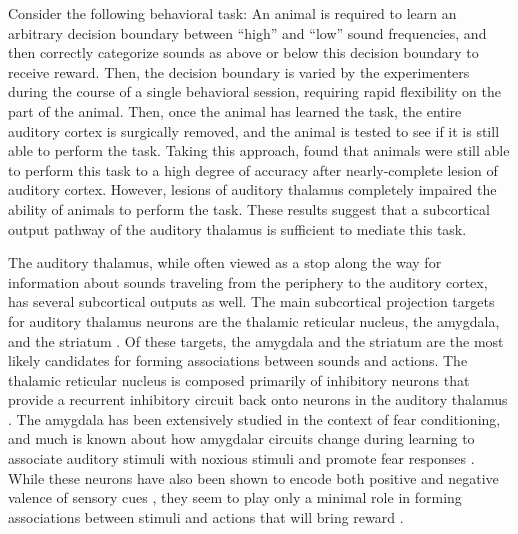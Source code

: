Consider the following behavioral task: An animal is required to learn an arbitrary decision boundary between ``high'' and ``low'' sound frequencies, and then correctly categorize sounds as above or below this decision boundary to receive reward.
Then, the decision boundary is varied by the experimenters during the course of a single behavioral session, requiring rapid flexibility on the part of the animal.
Then, once the animal has learned the task, the entire auditory cortex is surgically removed, and the animal is tested to see if it is still able to perform the task.
Taking this approach, \citet{Gimenez2015} found that animals were still able to perform this task to a high degree of accuracy after nearly-complete lesion of auditory cortex.
However, lesions of auditory thalamus completely impaired the ability of animals to perform the task. 
These results suggest that a subcortical output pathway of the auditory thalamus is sufficient to mediate this task.

The auditory thalamus, while often viewed as a stop along the way for information about sounds traveling from the periphery to the auditory cortex, has several subcortical outputs as well.
The main subcortical projection targets for auditory thalamus neurons are the thalamic reticular nucleus, the amygdala, and the striatum \citep{Pinault2004, Bartlett2013}.
Of these targets, the amygdala and the striatum are the most likely candidates for forming associations between sounds and actions.
The thalamic reticular nucleus is composed primarily of inhibitory neurons that provide a recurrent inhibitory circuit back onto neurons in the auditory thalamus \citep{Pinault2004}. 
The amygdala has been extensively studied in the context of fear conditioning, and much is known about how amygdalar circuits change during learning to associate auditory stimuli with noxious stimuli and promote fear responses \citep{Romanski1992, Rogan1997, Doron1999, Ledoux2000}. 
%
While these neurons have also been shown to encode both positive and negative valence of sensory cues \citep{Tye2008}, they seem to play only a minimal role in forming associations between stimuli and actions that will bring reward \citep{Baxter2002}.


